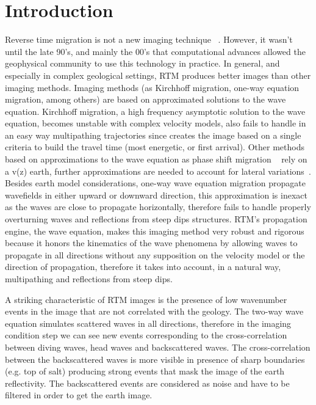\section{Introduction}

Reverse time migration is not a new imaging technique ~\citep{baysal:1514, whitmore:382, GPR:GPR413}.
However, it wasn't until the late 90's, and mainly the 00's that computational advances
allowed the geophysical community to use this technology in practice. In general, and 
especially in complex geological settings,  RTM produces better images than other 
imaging methods. Imaging methods (as Kirchhoff migration, one-way equation migration, among others)
are based on approximated solutions to the wave equation.
Kirchhoff migration, a high frequency asymptotic solution to the wave equation, becomes
 unstable with complex velocity models, also fails to handle in an easy way multipathing
trajectories since creates the image based on a single criteria to build the travel time 
(most energetic, or first arrival). Other methods
based on approximations to the wave equation as phase shift migration ~\citep{gazdag:1342} 
rely on a v(z) earth, further approximations are needed to account for lateral variations~\citep{gazdag:124}.
 Besides earth model considerations, one-way wave equation migration propagate wavefields in 
either upward or downward direction, this approximation is inexact as the waves are close
to propagate horizontally, therefore fails to handle properly overturning
waves and reflections from steep dips structures. RTM's propagation engine, the wave equation, 
makes this imaging method very robust and rigorous because it honors the kinematics of 
the wave phenomena by allowing waves to propagate in all directions without any supposition
on the velocity model or the direction of propagation, therefore it takes into account, in a natural way,  
multipathing and  reflections from steep dips.

A striking characteristic of RTM images is the presence of low 
wavenumber events in the image that are not correlated with the geology. The two-way
wave equation simulates scattered waves in all directions, therefore in the imaging condition step
we can see new events corresponding to the cross-correlation between diving waves, head waves
and backscattered waves. The cross-correlation between the backscattered waves is more visible
in presence of sharp boundaries (e.g. top of salt) producing strong events that mask
the image of the earth reflectivity. The backscattered events are considered as noise and have to be
filtered in order to get the earth image.

